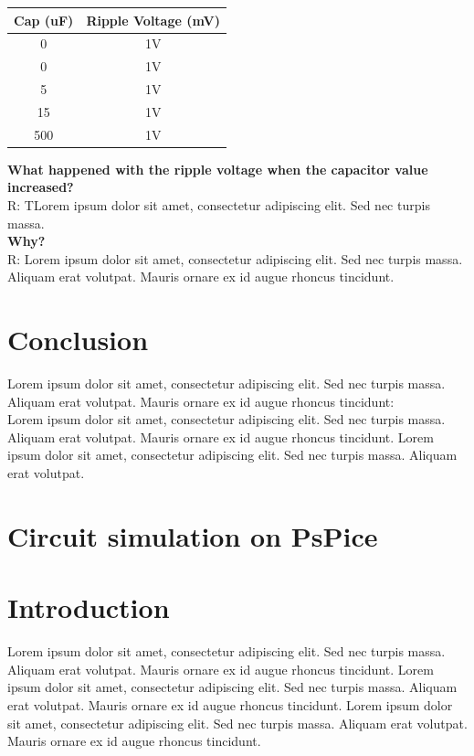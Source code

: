 \documentclass[article]{IEEEtran}
\begin{document}
\begin{center}
\begin{tabular}{|c|c|}
     \hline
    Cap (uF) & Ripple Voltage (mV) \\
     \hline
     0 & 1V \\
     \hline
     0 & 1V\\
     \hline
     5 & 1V\\
     \hline
     15 & 1V\\
     \hline
     500 & 1V\\
     \hline
\end{tabular}
\end{center}

\textbf{What happened with the ripple voltage when the capacitor value increased?}\\
R: TLorem ipsum dolor sit amet, consectetur adipiscing elit. Sed nec turpis massa.\\

\textbf{Why?}\\
R: Lorem ipsum dolor sit amet, consectetur adipiscing elit. Sed nec turpis massa. Aliquam erat volutpat. Mauris ornare ex id augue rhoncus tincidunt.


\section*{Conclusion}
Lorem ipsum dolor sit amet, consectetur adipiscing elit. Sed nec turpis massa. Aliquam erat volutpat. Mauris ornare ex id augue rhoncus tincidunt:\\
Lorem ipsum dolor sit amet, consectetur adipiscing elit. Sed nec turpis massa. Aliquam erat volutpat. Mauris ornare ex id augue rhoncus tincidunt. Lorem ipsum dolor sit amet, consectetur adipiscing elit. Sed nec turpis massa. Aliquam erat volutpat. 


\section{Circuit simulation on PsPice }
\section*{Introduction}
Lorem ipsum dolor sit amet, consectetur adipiscing elit. Sed nec turpis massa. Aliquam erat volutpat. Mauris ornare ex id augue rhoncus tincidunt. Lorem ipsum dolor sit amet, consectetur adipiscing elit. Sed nec turpis massa. Aliquam erat volutpat. Mauris ornare ex id augue rhoncus tincidunt. Lorem ipsum dolor sit amet, consectetur adipiscing elit. Sed nec turpis massa. Aliquam erat volutpat. Mauris ornare ex id augue rhoncus tincidunt. 
\end{document}
